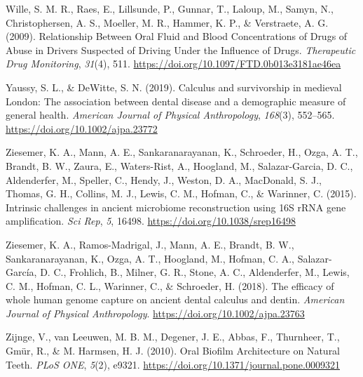 \documentclass[
  b5paper,
]{book}
\newlength{\cslhangindent}
\newlength{\cslentryspacingunit} %
\newenvironment{CSLReferences}[2] %
 {%
  \setlength{\parindent}{0pt}
  \ifodd #1
  \let\oldpar\par
  \def\par{\hangindent=\cslhangindent\oldpar}
  \fi
  \setlength{\parskip}{#2\cslentryspacingunit}
 }%
 {}
\begin{document}
\begin{CSLReferences}{1}{0}
\leavevmode{}%
Wille, S. M. R., Raes, E., Lillsunde, P., Gunnar, T., Laloup, M., Samyn,
N., Christophersen, A. S., Moeller, M. R., Hammer, K. P., \& Verstraete,
A. G. (2009). Relationship {Between Oral Fluid} and {Blood
Concentrations} of {Drugs} of {Abuse} in {Drivers Suspected} of {Driving
Under} the {Influence} of {Drugs}. \emph{Therapeutic Drug Monitoring},
\emph{31}(4), 511. \url{https://doi.org/10.1097/FTD.0b013e3181ae46ea}

\leavevmode{}%
Yaussy, S. L., \& DeWitte, S. N. (2019). Calculus and survivorship in
medieval {London}: {The} association between dental disease and a
demographic measure of general health. \emph{American Journal of
Physical Anthropology}, \emph{168}(3), 552--565.
\url{https://doi.org/10.1002/ajpa.23772}

\leavevmode{}%
Ziesemer, K. A., Mann, A. E., Sankaranarayanan, K., Schroeder, H., Ozga,
A. T., Brandt, B. W., Zaura, E., Waters-Rist, A., Hoogland, M.,
Salazar-Garcia, D. C., Aldenderfer, M., Speller, C., Hendy, J., Weston,
D. A., MacDonald, S. J., Thomas, G. H., Collins, M. J., Lewis, C. M.,
Hofman, C., \& Warinner, C. (2015). Intrinsic challenges in ancient
microbiome reconstruction using {16S rRNA} gene amplification. \emph{Sci
Rep}, \emph{5}, 16498. \url{https://doi.org/10.1038/srep16498}

\leavevmode{}%
Ziesemer, K. A., Ramos-Madrigal, J., Mann, A. E., Brandt, B. W.,
Sankaranarayanan, K., Ozga, A. T., Hoogland, M., Hofman, C. A.,
Salazar-García, D. C., Frohlich, B., Milner, G. R., Stone, A. C.,
Aldenderfer, M., Lewis, C. M., Hofman, C. L., Warinner, C., \&
Schroeder, H. (2018). The efficacy of whole human genome capture on
ancient dental calculus and dentin. \emph{American Journal of Physical
Anthropology}. \url{https://doi.org/10.1002/ajpa.23763}

\leavevmode{}%
Zijnge, V., van Leeuwen, M. B. M., Degener, J. E., Abbas, F., Thurnheer,
T., Gmür, R., \& M. Harmsen, H. J. (2010). Oral {Biofilm Architecture}
on {Natural Teeth}. \emph{PLoS ONE}, \emph{5}(2), e9321.
\url{https://doi.org/10.1371/journal.pone.0009321}

\end{CSLReferences}

\end{document}
